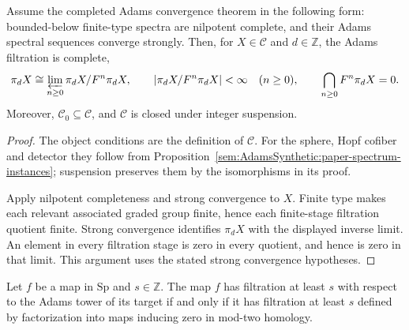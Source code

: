 \begin{theorem}
\label{sem:AdamsSynthetic:completed-adams-scope}
Assume the completed Adams convergence theorem in the following form:
bounded-below finite-type spectra are nilpotent complete, and their
Adams spectral sequences converge strongly. Then, for $X\in\mathcal C$
and $d\in\mathbb Z$, the Adams filtration is complete,
\[
 \pi_dX\cong\varprojlim_{n\geq0}\pi_dX/F^n\pi_dX,
 \qquad |\pi_dX/F^n\pi_dX|<\infty\quad(n\geq0),
 \qquad \bigcap_{n\geq0}F^n\pi_dX=0.
\]
Moreover, $\mathcal C_0\subseteq\mathcal C$, and $\mathcal C$ is closed
under integer suspension.
\end{theorem}
\begin{proof}
The object conditions are the definition of $\mathcal C$. For the sphere, Hopf cofiber and detector they follow from Proposition~\ref{sem:AdamsSynthetic:paper-spectrum-instances}; suspension preserves them by the isomorphisms in its proof.

Apply nilpotent completeness and strong convergence to $X$. Finite type makes each relevant associated graded group finite, hence each finite-stage filtration quotient finite. Strong convergence identifies $\pi_dX$ with the displayed inverse limit.
An element in every filtration stage is zero in every quotient, and hence
is zero in that limit. This argument uses the stated strong convergence hypotheses.
\end{proof}

\begin{theorem}
\label{sem:AdamsSynthetic:filtration-comparison}
Let $f$ be a map in $\mathrm{Sp}$ and $s\in\mathbb Z$. The map $f$ has filtration at least $s$ with respect to the Adams tower of its target if and only if it has filtration at least $s$ defined by factorization into maps inducing zero in mod-two homology.
\end{theorem}

